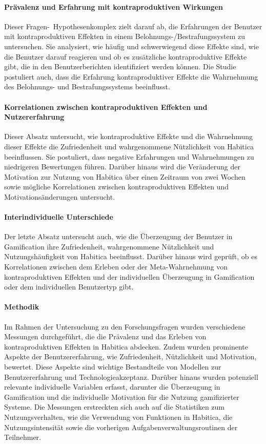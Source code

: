 \documentclass[sigconf, nonacm]{acmart}
\begin{document}
\paragraph{Prävalenz und Erfahrung mit kontraproduktiven Wirkungen}

Dieser Fragen-\ Hypothesenkomplex zielt darauf ab, die Erfahrungen der Benutzer mit kontraproduktiven Effekten in einem Belohnungs-/Bestrafungssystem zu untersuchen. Sie analysiert, wie häufig und schwerwiegend diese Effekte sind, wie die Benutzer darauf reagieren und ob es zusätzliche kontraproduktive Effekte gibt, die in den Benutzerberichten identifiziert werden können. Die Studie postuliert auch, dass die Erfahrung kontraproduktiver Effekte die Wahrnehmung des Belohnungs- und Bestrafungssystems beeinflusst.

\paragraph{Korrelationen zwischen kontraproduktiven Effekten und Nutzererfahrung}

Dieser Absatz untersucht, wie kontraproduktive Effekte und die Wahrnehmung dieser Effekte die Zufriedenheit und wahrgenommene Nützlichkeit von Habitica beeinflussen. Sie postuliert, dass negative Erfahrungen und Wahrnehmungen zu niedrigeren Bewertungen führen. Darüber hinaus wird die Veränderung der Motivation zur Nutzung von Habitica über einen Zeitraum von zwei Wochen sowie mögliche Korrelationen zwischen kontraproduktiven Effekten und Motivationsänderungen untersucht.

\paragraph{Interindividuelle Unterschiede}

Der letzte Absatz untersucht auch, wie die Überzeugung der Benutzer in Gamification ihre Zufriedenheit, wahrgenommene Nützlichkeit und Nutzungshäufigkeit von Habitica beeinflusst. Darüber hinaus wird geprüft, ob es Korrelationen zwischen dem Erleben oder der Meta-Wahrnehmung von kontraproduktiven Effekten und der individuellen Überzeugung in Gamification oder dem individuellen Benutzertyp gibt.

\paragraph{Methodik}
Im Rahmen der Untersuchung zu den Forschungsfragen wurden verschiedene Messungen durchgeführt, die die Prävalenz und das Erleben von kontraproduktiven Effekten in Habitica abdecken. Zudem wurden prominente Aspekte der Benutzererfahrung, wie Zufriedenheit, Nützlichkeit und Motivation, bewertet. Diese Aspekte sind wichtige Bestandteile von Modellen zur Benutzererfahrung und Technologieakzeptanz.
Darüber hinaus wurden potenziell relevante individuelle Variablen erfasst, darunter die Überzeugung in Gamification und die individuelle Motivation für die Nutzung gamifizierter Systeme. Die Messungen erstreckten sich auch auf die Statistiken zum Nutzungsverhalten, wie die Verwendung von Funktionen in Habitica, die Nutzungsintensität sowie die vorherigen Aufgabenverwaltungsroutinen der Teilnehmer.
\end{document}
